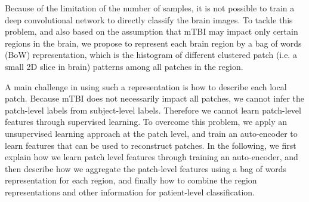 \documentclass[letterpaper, 10 pt, conference]{ieeeconf}  %
\begin{document}

Because of the limitation of the number of samples, it is not possible to train a deep convolutional network to directly classify the brain images. 
To tackle this problem, and also based on the assumption that mTBI may impact only certain regions in the brain, we propose to represent each brain region by a bag of words (BoW) representation, which is the histogram of different clustered  patch (i.e. a small 2D slice in brain) patterns among all patches in the region. 

A main challenge in using such a representation is how to describe each local patch. 
Because mTBI does not necessarily impact all patches, we cannot infer the patch-level  labels from subject-level labels. 
Therefore we cannot learn patch-level features through supervised learning. To overcome this problem, we apply an unsupervised learning approach at the patch level, and train an auto-encoder to learn features that can be used to reconstruct patches.
In the following,  we first explain how we learn patch level features through training an auto-encoder, and then describe how we aggregate the patch-level features using a bag of words representation for each region, and finally how to combine the region representations and other information for patient-level classification.
\end{document}
